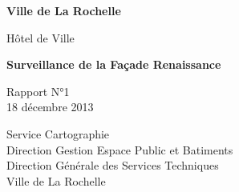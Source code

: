 


\begin{titlepage}
  \begin{center}
    \vspace*{1cm}

    \Huge
    \textbf{Ville de La Rochelle}

    \vspace{0.5cm}
    \LARGE
    Hôtel de Ville

    \vspace{1.5cm}

    \textbf{Surveillance de la Façade Renaissance}

    \vfill

    Rapport N°1\\
    18 décembre 2013

    \vspace{0.8cm}


    \Large
    Service Cartographie\\
    Direction Gestion Espace Public et Batiments\\
    Direction Générale des Services Techniques\\
    Ville de La Rochelle\\

  \end{center}
\end{titlepage}

